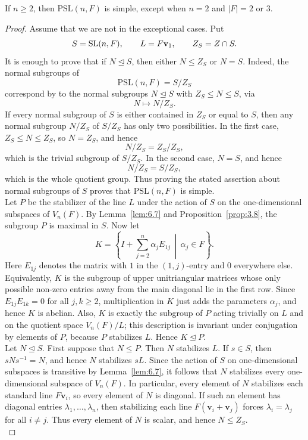 \documentclass[../Odyssey_Project.tex]{subfiles}
\begin{document}
\begin{theorem}
\label{thm:6.8}
If $n \geq 2$, then $\mathrm{PSL}(n,F)$ is simple, except when $n = 2$ and $|F| = 2$ or $3$.
\end{theorem}
\begin{proof}
Assume that we are not in the exceptional cases. Put
\[
    S=\operatorname{SL}(n,F),
    \qquad
    L=F\mathbf{v}_1,
    \qquad
    Z_S=Z\cap S.
\]
It is enough to prove that if $N\trianglelefteq S$, then either $N\leq Z_S$ or $N=S$. Indeed, the normal subgroups of
\[
    \mathrm{PSL}(n,F)=S/Z_S
\]
correspond by  to the normal subgroups $N\trianglelefteq S$ with $Z_S\leq N\leq S$, via
\[
    N\longmapsto N/Z_S.
\]
If every normal subgroup of $S$ is either contained in $Z_S$ or equal to $S$, then any normal subgroup $N/Z_S$ of $S/Z_S$ has only two possibilities. In the first case, $Z_S\leq N\leq Z_S$, so $N=Z_S$, and hence
\[
    N/Z_S=Z_S/Z_S,
\]
which is the trivial subgroup of $S/Z_S$. In the second case, $N=S$, and hence
\[
    N/Z_S=S/Z_S,
\]
which is the whole quotient group. Thus proving the stated assertion about normal subgroups of $S$ proves that $\mathrm{PSL}(n,F)$ is simple.\\
Let $P$ be the stabilizer of the line $L$ under the action of $S$ on the one-dimensional subspaces of $V_n(F)$. By Lemma~\ref{lem:6.7} and Proposition~\ref{prop:3.8}, the subgroup $P$ is maximal in $S$. Now let
\[
    K=\left\{
    I+\sum_{j=2}^{n}\alpha_jE_{1j}
    \,\middle|\,
    \alpha_j\in F
    \right\}.
\]
Here $E_{1j}$ denotes the matrix with $1$ in the $(1,j)$-entry and $0$ everywhere else.
Equivalently, $K$ is the subgroup of upper unitriangular matrices whose only possible non-zero entries away from the main diagonal lie in the first row. Since $E_{1j}E_{1k}=0$ for all $j,k\geq2$, multiplication in $K$ just adds the parameters $\alpha_j$, and hence $K$ is abelian. Also, $K$ is exactly the subgroup of $P$ acting trivially on $L$ and on the quotient space $V_n(F)/L$; this description is invariant under conjugation by elements of $P$, because $P$ stabilizes $L$. Hence $K\trianglelefteq P$.\\
Let $N\trianglelefteq S$. First suppose that $N\leq P$. Then $N$ stabilizes $L$. If $s\in S$, then $sNs^{-1}=N$, and hence $N$ stabilizes $sL$. Since the action of $S$ on one-dimensional subspaces is transitive by Lemma~\ref{lem:6.7}, it follows that $N$ stabilizes every one-dimensional subspace of $V_n(F)$. In particular, every element of $N$ stabilizes each standard line $F\mathbf{v}_i$, so every element of $N$ is diagonal. If such an element has diagonal entries $\lambda_1,\ldots,\lambda_n$, then stabilizing each line $F(\mathbf{v}_i+\mathbf{v}_j)$ forces $\lambda_i=\lambda_j$ for all $i\neq j$. Thus every element of $N$ is scalar, and hence $N\leq Z_S$.\\

\end{proof}
\end{document}
